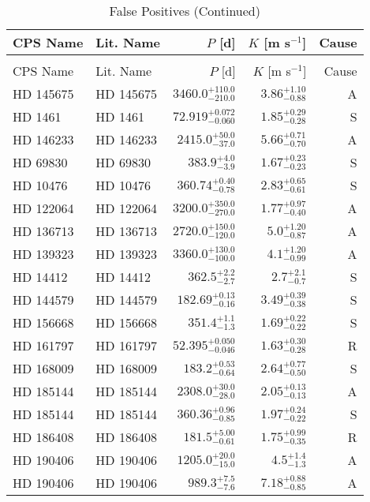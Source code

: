 \begin{longtable*}{llrrr}
\caption{False Positives} \\
\toprule
\midrule

CPS Name & Lit. Name & $P$ [d] & $K$ [m s$^{-1}$] & Cause \\
\toprule
\endfirsthead
\caption[]{False Positives (Continued)} \\
\toprule
\midrule
CPS Name & Lit. Name & $P$ [d] & $K$ [m s$^{-1}$] & Cause \\
\toprule
\endhead
HD 145675 & HD 145675 & $3460.0^{+110.0}_{-210.0}$ & $3.86^{+1.10}_{-0.88}$ & A \\
HD 1461 & HD 1461 & $72.919^{+0.072}_{-0.060}$ & $1.85^{+0.29}_{-0.28}$ & S \\
HD 146233 & HD 146233 & $2415.0^{+50.0}_{-37.0}$ & $5.66^{+0.71}_{-0.70}$ & A \\
HD 69830 & HD 69830 & $383.9^{+4.0}_{-3.9}$ & $1.67^{+0.23}_{-0.23}$ & S \\
HD 10476 & HD 10476 & $360.74^{+0.40}_{-0.78}$ & $2.83^{+0.65}_{-0.61}$ & S \\
HD 122064 & HD 122064 & $3200.0^{+350.0}_{-270.0}$ & $1.77^{+0.97}_{-0.40}$ & A \\
HD 136713 & HD 136713 & $2720.0^{+150.0}_{-120.0}$ & $5.0^{+1.20}_{-0.87}$ & A \\
HD 139323 & HD 139323 & $3360.0^{+130.0}_{-100.0}$ & $4.1^{+1.20}_{-0.99}$ & A \\
HD 14412 & HD 14412 & $362.5^{+2.2}_{-2.7}$ & $2.7^{+2.1}_{-0.7}$ & S \\
HD 144579 & HD 144579 & $182.69^{+0.13}_{-0.16}$ & $3.49^{+0.39}_{-0.38}$ & S \\
HD 156668 & HD 156668 & $351.4^{+1.1}_{-1.3}$ & $1.69^{+0.22}_{-0.22}$ & S \\
HD 161797 & HD 161797 & $52.395^{+0.050}_{-0.046}$ & $1.63^{+0.30}_{-0.28}$ & R \\
HD 168009 & HD 168009 & $183.2^{+0.53}_{-0.64}$ & $2.64^{+0.77}_{-0.50}$ & S \\
HD 185144 & HD 185144 & $2308.0^{+30.0}_{-28.0}$ & $2.05^{+0.13}_{-0.13}$ & A \\
HD 185144 & HD 185144 & $360.36^{+0.96}_{-0.85}$ & $1.97^{+0.24}_{-0.22}$ & S \\
HD 186408 & HD 186408 & $181.5^{+5.00}_{-0.61}$ & $1.75^{+0.99}_{-0.35}$ & R \\
HD 190406 & HD 190406 & $1205.0^{+20.0}_{-15.0}$ & $4.5^{+1.4}_{-1.3}$ & A \\
HD 190406 & HD 190406 & $989.3^{+7.5}_{-7.6}$ & $7.18^{+0.88}_{-0.85}$ & A \\

\end{longtable*}
